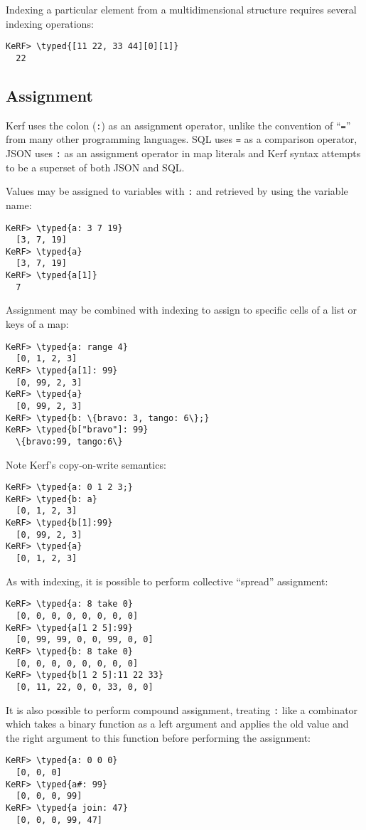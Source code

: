 \documentclass{article}
\newcommand{\typed}[1]{\textcolor{TealBlue}{#1}}
\begin{document}
Indexing a particular element from a multidimensional structure requires several indexing operations:
\begin{Verbatim}
KeRF> \typed{[11 22, 33 44][0][1]}
  22
\end{Verbatim}

\pagebreak
\subsection{Assignment}
Kerf uses the colon (\texttt{:}) as an assignment operator, unlike the convention of ``\texttt{=}'' from many other programming languages. SQL uses \texttt{=} as a comparison operator, JSON uses \texttt{:} as an assignment operator in map literals and Kerf syntax attempts to be a superset of both JSON and SQL.

\vspace{0.5cm}

Values may be assigned to variables with \texttt{:} and retrieved by using the variable name:
\begin{Verbatim}
KeRF> \typed{a: 3 7 19}
  [3, 7, 19]
KeRF> \typed{a}
  [3, 7, 19]
KeRF> \typed{a[1]}
  7
\end{Verbatim}

Assignment may be combined with indexing to assign to specific cells of a list or keys of a map:
\begin{Verbatim}
KeRF> \typed{a: range 4}
  [0, 1, 2, 3]
KeRF> \typed{a[1]: 99}
  [0, 99, 2, 3]
KeRF> \typed{a}
  [0, 99, 2, 3]
KeRF> \typed{b: \{bravo: 3, tango: 6\};}
KeRF> \typed{b["bravo"]: 99}
  \{bravo:99, tango:6\}
\end{Verbatim}

Note Kerf's copy-on-write semantics:
\begin{Verbatim}
KeRF> \typed{a: 0 1 2 3;}
KeRF> \typed{b: a}
  [0, 1, 2, 3]
KeRF> \typed{b[1]:99}
  [0, 99, 2, 3]
KeRF> \typed{a}
  [0, 1, 2, 3]
\end{Verbatim}

As with indexing, it is possible to perform collective ``spread'' assignment:
\begin{Verbatim}
KeRF> \typed{a: 8 take 0}
  [0, 0, 0, 0, 0, 0, 0, 0]
KeRF> \typed{a[1 2 5]:99}
  [0, 99, 99, 0, 0, 99, 0, 0]
KeRF> \typed{b: 8 take 0}
  [0, 0, 0, 0, 0, 0, 0, 0]
KeRF> \typed{b[1 2 5]:11 22 33}
  [0, 11, 22, 0, 0, 33, 0, 0]
\end{Verbatim}

\pagebreak
It is also possible to perform compound assignment, treating \texttt{:} like a combinator which takes a binary function as a left argument and applies the old value and the right argument to this function before performing the assignment:
\begin{Verbatim}
KeRF> \typed{a: 0 0 0}
  [0, 0, 0]
KeRF> \typed{a#: 99}
  [0, 0, 0, 99]
KeRF> \typed{a join: 47}
  [0, 0, 0, 99, 47]
\end{Verbatim}
\end{document}
